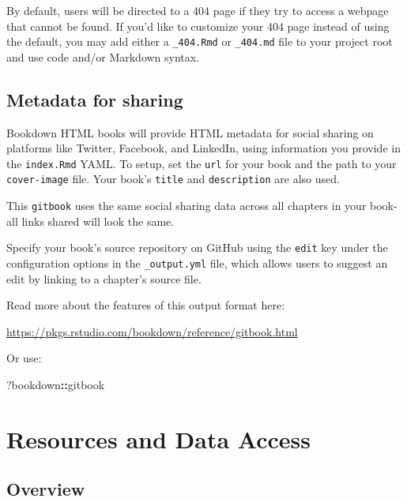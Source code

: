 \documentclass[
]{book}
\newenvironment{Shaded}{\begin{snugshade}}{\end{snugshade}}
\newcommand{\NormalTok}[1]{#1}
\newcommand{\SpecialCharTok}[1]{\textcolor[rgb]{0.81,0.36,0.00}{\textbf{#1}}}
\begin{document}
By default, users will be directed to a 404 page if they try to access a webpage that cannot be found. If you'd like to customize your 404 page instead of using the default, you may add either a \texttt{\_404.Rmd} or \texttt{\_404.md} file to your project root and use code and/or Markdown syntax.

\hypertarget{metadata-for-sharing}{%
\section{Metadata for sharing}\label{metadata-for-sharing}}

Bookdown HTML books will provide HTML metadata for social sharing on platforms like Twitter, Facebook, and LinkedIn, using information you provide in the \texttt{index.Rmd} YAML. To setup, set the \texttt{url} for your book and the path to your \texttt{cover-image} file. Your book's \texttt{title} and \texttt{description} are also used.

This \texttt{gitbook} uses the same social sharing data across all chapters in your book- all links shared will look the same.

Specify your book's source repository on GitHub using the \texttt{edit} key under the configuration options in the \texttt{\_output.yml} file, which allows users to suggest an edit by linking to a chapter's source file.

Read more about the features of this output format here:

\url{https://pkgs.rstudio.com/bookdown/reference/gitbook.html}

Or use:

\begin{Shaded}
\begin{Highlighting}[]
\NormalTok{?bookdown}\SpecialCharTok{::}\NormalTok{gitbook}
\end{Highlighting}
\end{Shaded}

\hypertarget{resources-and-data-access}{%
\chapter{Resources and Data Access}\label{resources-and-data-access}}

\hypertarget{overview-3}{%
\section{Overview}\label{overview-3}}
\end{document}
